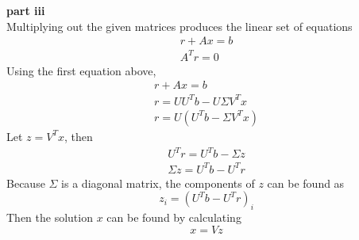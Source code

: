 \documentclass{article} %
\begin{document}
\textbf{part iii} \\
Multiplying out the given matrices produces the linear set of equations
\begin{align*}
r + Ax = b \\
A^T r = 0
\end{align*}
Using the first equation above,
\begin{align*}
r + Ax = b \\
r = U U^T b - U \Sigma V^T x \\
r = U (U^T b - \Sigma V^Tx)
\end{align*}
Let $z=V^T x$, then
\begin{align*}
U^T r = U^T b - \Sigma z \\
\Sigma z = U^Tb - U^T r
\end{align*}
Because $\Sigma$ is a diagonal matrix, the components of $z$ can be found as 
\begin{equation*}
z_i = (U^T b - U^T r)_i
\end{equation*}
Then the solution $x$ can be found by calculating 
\begin{equation*}
x = Vz
\end{equation*}
\\
\end{document}
